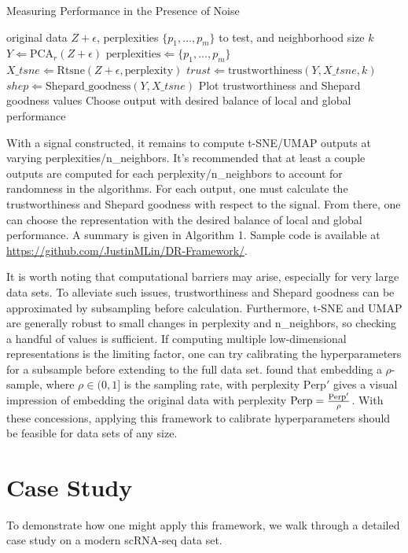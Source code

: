 \documentclass{article}
\begin{document}
\begin{algorithm}[b]
\caption{Measuring Performance in the Presence of Noise}\label{algo1}
\begin{algorithmic}[1]
\Require original data $Z + \epsilon$, perplexities $\{p_1, \hdots, p_m\}$ to test, and neighborhood size $k$
\State $Y \Leftarrow \textrm{PCA}_r(Z + \epsilon)$
\State $\textrm{perplexities} \Leftarrow \{p_1, \hdots, p_m\}$
	\Loop
		\State $X\_tsne \Leftarrow \textrm{Rtsne}(Z + \epsilon, \textrm{perplexity})$
		\State $trust \Leftarrow \textrm{trustworthiness}(Y, X\_tsne, k)$
		\State $shep \Leftarrow \textrm{Shepard\_goodness}(Y, X\_tsne)$
	\EndLoop
\EndFor
\State Plot trustworthiness and Shepard goodness values
\State Choose output with desired balance of local and global performance
\end{algorithmic}
\end{algorithm}

With a signal constructed, it remains to compute t-SNE/UMAP outputs at varying perplexities/n\_neighbors. It's recommended that at least a couple outputs are computed for each perplexity/n\_neighbors to account for randomness in the algorithms. For each output, one must calculate the trustworthiness and Shepard goodness with respect to the signal. From there, one can choose the representation with the desired balance of local and global performance. A summary is given in Algorithm 1. Sample code is available at \url{https://github.com/JustinMLin/DR-Framework/}.

It is worth noting that computational barriers may arise, especially for very large data sets. To alleviate such issues, trustworthiness and Shepard goodness can be approximated by subsampling before calculation. Furthermore, t-SNE and UMAP are generally robust to small changes in perplexity and n\_neighbors, so checking a handful of values is sufficient. If computing multiple low-dimensional representations is the limiting factor, one can try calibrating the hyperparameters for a subsample before extending to the full data set. \cite{subsample t-SNE} found that embedding a $\rho$-sample, where $\rho \in (0,1]$ is the sampling rate, with perplexity $\textrm{Perp}'$ gives a visual impression of embedding the original data with perplexity $\textrm{\textrm{Perp}} = \frac{\textrm{Perp}'}{\rho}$. With these concessions, applying this framework to calibrate hyperparameters should be feasible for data sets of any size.

\section{Case Study}
To demonstrate how one might apply this framework, we walk through a detailed case study on a modern scRNA-seq data set.
\end{document}
